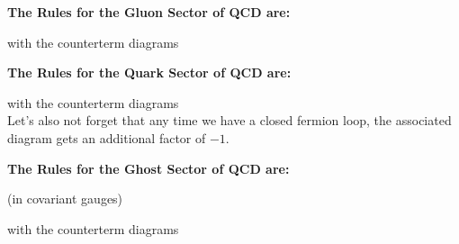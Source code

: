 \begin{answer}
\begin{center}
{\normalfont\Large\bfseries\sffamily The Rules for the Gluon Sector of QCD are:}
\end{center}

\begin{subequations}



\end{subequations}
with the counterterm diagrams
\begin{subequations}
% 
\end{subequations}
\end{answer}

\begin{answer}
\begin{center}
{\normalfont\Large\bfseries\sffamily The Rules for the Quark Sector of QCD are:}
\end{center}

\begin{subequations}


\end{subequations}
with the counterterm diagrams
\begin{subequations}
% 
\end{subequations}
Let's also not forget that any time we have a closed fermion loop, the associated diagram gets an additional factor of \(-1\).
\end{answer}

\begin{answer}
\begin{center}
{\normalfont\Large\bfseries\sffamily The Rules for the Ghost Sector of QCD are:}

(in covariant gauges)
\end{center}

\begin{subequations}


\end{subequations}
with the counterterm diagrams
\begin{subequations}
% 
\end{subequations}
\end{answer}
